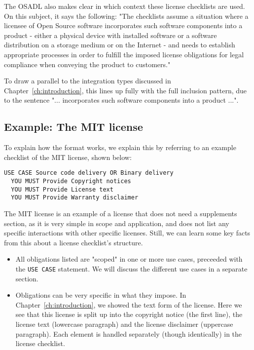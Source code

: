 The OSADL also makes clear in which context these license checklists are used. On this subject, it says the following: "The checklists assume a situation where a licensee of Open Source software incorporates such software components into a product - either a physical device with installed software or a software distribution on a storage medium or on the Internet - and needs to establish appropriate processes in order to fulfill the imposed license obligations for legal compliance when conveying the product to customers."~\cite{osadl-license-checklists-scope}

To draw a parallel to the integration types discussed in Chapter~\ref{ch:introduction}, this lines up fully with the full inclusion pattern, due to the sentence "... incorporates such software components into a product ...".

\subsection{Example: The MIT license}

To explain how the format works, we explain this by referring to an example checklist of the MIT license, shown below:

\begin{verbatim}
USE CASE Source code delivery OR Binary delivery
  YOU MUST Provide Copyright notices
  YOU MUST Provide License text
  YOU MUST Provide Warranty disclaimer
\end{verbatim}

The MIT license is an example of a license that does not need a supplements section, as it is very simple in scope and application, and does not list any specific interactions with other specific licenses. Still, we can learn some key facts from this about a license checklist's structure.

\begin{itemize}
	\item All obligations listed are "scoped" in one or more use cases, preceeded with the \texttt{USE CASE} statement. We will discuss the different use cases in a separate section.
	\item Obligations can be very specific in what they impose. In Chapter~\ref{ch:introduction}, we showed the text form of the license. Here we see that this license is split up into the copyright notice (the first line), the license text (lowercase paragraph) and the license disclaimer (uppercase paragraph). Each element is handled separately (though identically) in the license checklist.
\end{itemize}

